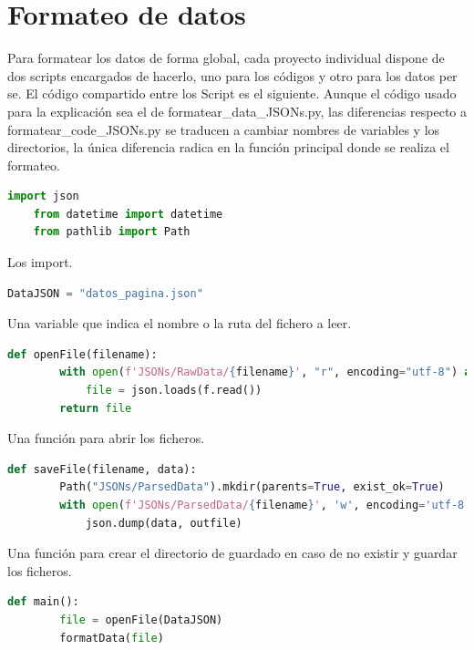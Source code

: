 \section{Formateo de datos}
Para formatear los datos de forma global, cada proyecto individual dispone de dos scripts encargados de hacerlo, uno para los códigos y otro para los datos per se.\newline
\newline
El código compartido entre los Script es el siguiente. Aunque el código usado para la explicación sea el de formatear\_data\_JSONs.py, las diferencias respecto a formatear\_code\_JSONs.py se traducen a cambiar nombres de variables y los directorios, la única diferencia radica en la función principal donde se realiza el formateo.

\begin{lstlisting}[language=Python, caption={Import necesarios formateo de datos}]
	import json
	from datetime import datetime
	from pathlib import Path
\end{lstlisting}

Los import.

\begin{lstlisting}[language=Python, caption={Declaración variable del JSON}]
	DataJSON = "datos_pagina.json"
\end{lstlisting}

Una variable que indica el nombre o la ruta del fichero a leer.

\begin{lstlisting}[language=Python, caption={Declaración función \textit{openFile()}}]
	def openFile(filename):
		with open(f'JSONs/RawData/{filename}', "r", encoding="utf-8") as f:
			file = json.loads(f.read())
		return file
\end{lstlisting}

Una función para abrir los ficheros.

\begin{lstlisting}[language=Python, caption={Declaración función \textit{saveFile()}}]
	def saveFile(filename, data):
		Path("JSONs/ParsedData").mkdir(parents=True, exist_ok=True)
		with open(f'JSONs/ParsedData/{filename}', 'w', encoding='utf-8') as outfile:
			json.dump(data, outfile)
\end{lstlisting}

Una función para crear el directorio de guardado en caso de no existir y guardar los ficheros.

\begin{lstlisting}[language=Python, caption={Declaración función \textit{main()}}]
	def main():
		file = openFile(DataJSON)
		formatData(file)
\end{lstlisting}

